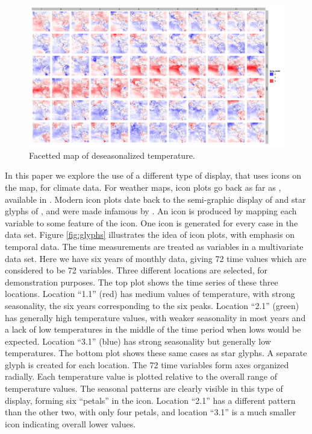\documentclass[oneside]{article}
\begin{document}
\begin{figure}[htp]
\centerline{\includegraphics[width=6in]{nasa-colored-map.png}}
\caption{Facetted map of deseasonalized temperature.}
\label{fig:facetted-map}
\end{figure}

In this paper we explore the use of a different type of display, that uses icons on the map, for climate data.  For weather maps, icon plots go back as far as \citet{galton:weathermap}, available in \citet{friendlydenis:2001}. Modern icon plots date back to the semi-graphic display of \citet{anderson:1960} and star glyphs of  \citep{kleiner:1981}, and were made infamous by \citep{chernoff:1973}. An icon is produced by mapping each variable to some feature of the icon. One icon is generated for every case in the data set. Figure \ref{fig:glyphs} illustrates the idea of icon plots, with emphasis on temporal data. The time measurements are treated as variables in a multivariate data set. Here we have six years of monthly data, giving 72 time values which are considered to be 72 variables. Three different locations are selected, for demonstration purposes. The top plot shows the time series of these three locations. Location ``1.1'' (red) has medium values of temperature, with strong seasonality, the six years corresponding to the six peaks. Location ``2.1'' (green) has generally high temperature values, with weaker seasonality in most years and a lack of low temperatures in the middle of the time period when lows would be expected. Location ``3.1'' (blue) has strong seasonality but generally low temperatures. The bottom plot shows these same cases as star glyphs. A separate glyph is created for each location. The 72 time variables form axes organized radially. Each temperature value is plotted relative to the overall range of temperature values. The seasonal patterns are clearly visible in this type of display, forming six ``petals'' in the icon. Location ``2.1'' has a different pattern than the other two, with only four petals, and location ``3.1'' is a much smaller icon indicating overall lower values. 
\end{document}
